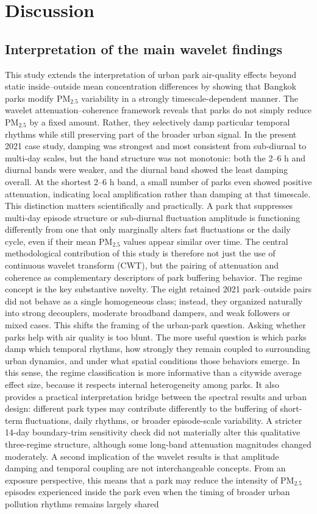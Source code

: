 \section{Discussion} \subsection{Interpretation of the main wavelet findings} This study extends the interpretation of urban park air-quality effects beyond static inside--outside mean concentration differences by showing that Bangkok parks modify PM$_{2.5}$ variability in a strongly timescale-dependent manner. The wavelet attenuation--coherence framework reveals that parks do not simply reduce PM$_{2.5}$ by a fixed amount. Rather, they selectively damp particular temporal rhythms while still preserving part of the broader urban signal. In the present 2021 case study, damping was strongest and most consistent from sub-diurnal to multi-day scales, but the band structure was not monotonic: both the 2--6 h and diurnal bands were weaker, and the diurnal band showed the least damping overall. At the shortest 2--6 h band, a small number of parks even showed positive attenuation, indicating local amplification rather than damping at that timescale. This distinction matters scientifically and practically. A park that suppresses multi-day episode structure or sub-diurnal fluctuation amplitude is functioning differently from one that only marginally alters fast fluctuations or the daily cycle, even if their mean PM$_{2.5}$ values appear similar over time. The central methodological contribution of this study is therefore not just the use of continuous wavelet transform (CWT), but the pairing of attenuation and coherence as complementary descriptors of park buffering behavior. The regime concept is the key substantive novelty. The eight retained 2021 park--outside pairs did not behave as a single homogeneous class; instead, they organized naturally into strong decouplers, moderate broadband dampers, and weak followers or mixed cases. This shifts the framing of the urban-park question. Asking whether parks help with air quality is too blunt. The more useful question is which parks damp which temporal rhythms, how strongly they remain coupled to surrounding urban dynamics, and under what spatial conditions those behaviors emerge. In this sense, the regime classification is more informative than a citywide average effect size, because it respects internal heterogeneity among parks. It also provides a practical interpretation bridge between the spectral results and urban design: different park types may contribute differently to the buffering of short-term fluctuations, daily rhythms, or broader episode-scale variability. A stricter 14-day boundary-trim sensitivity check did not materially alter this qualitative three-regime structure, although some long-band attenuation magnitudes changed moderately. A second implication of the wavelet results is that amplitude damping and temporal coupling are not interchangeable concepts. From an exposure perspective, this means that a park may reduce the intensity of PM$_{2.5}$ episodes experienced inside the park even when the timing of broader urban pollution rhythms remains largely shared 